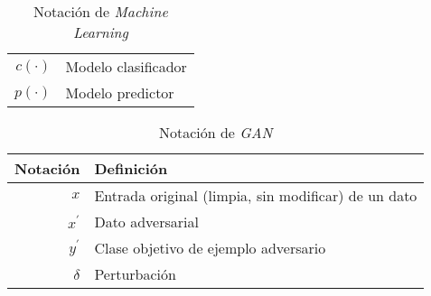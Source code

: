 \begin{table}[H]
\begin{center}
\begin{tabularx}{\textwidth}{|r|X|}
            $ {c}\left(\cdot\right) $                                                        & Modelo clasificador                                                                                                                                                             \\
            $ {p}\left(\cdot\right) $                                                        & Modelo predictor                                                                                                                                                                \\
            \hline
        \end{tabularx}
        \caption{Notación de \textit{Machine Learning}}
        \label{tab:nnotation-part-ml}
    \end{center}
\end{table}

\begin{table}[H]
    \begin{center}
        \begin{tabularx}{\textwidth}{|r|X|}
            \hline
            \textbf{Notación} & \textbf{Definición}                                 \\
            \hline %
            $ x $             & Entrada original (limpia, sin modificar) de un dato \\
            $ x^{\prime} $    & Dato adversarial                                    \\
            $ y^{\prime} $    & Clase objetivo de ejemplo adversario                \\
            $ \delta $        & Perturbación                                        \\

            \hline
        \end{tabularx}
        \caption{Notación de \textit{GAN}}
        \label{tab:nnotation-part-gans}
    \end{center}
\end{table}



